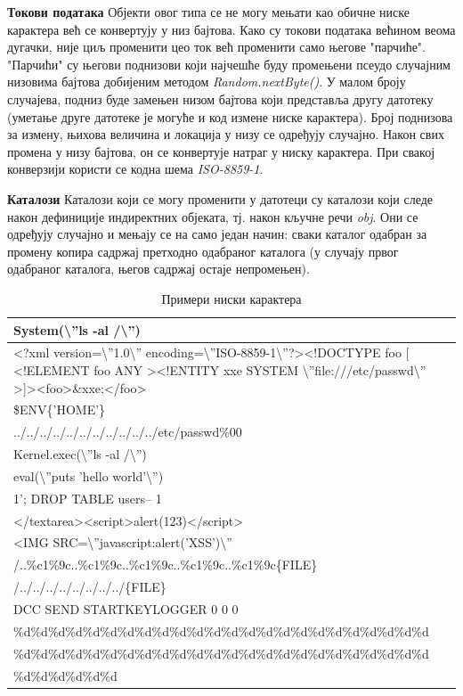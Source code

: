 \documentclass[12pt,oneside]{memoir}
\begin{document}
\begin{description}
\item{\textbf{Токови података}} Објекти овог типа се не могу мењати као обичне ниске карактера већ се конвертују у низ бајтова. Како су токови података већином веома дугачки, није циљ променити цео ток већ променити само његове "парчиће". "Парчићи" су његови поднизови који најчешће буду промењени псеудо случајним низовима бајтова добијеним методом \textit{Random.nextByte()}. У малом броју случајева, подниз буде замењен низом бајтова који представља другу датотеку (уметање друге датотеке је могуће и код измене ниске карактера). Број поднизова за измену, њихова величина и локација у низу се одређују случајно. Након свих промена у низу бајтова, он се конвертује натраг у ниску карактера. При свакој конверзији користи се кодна шема \textit{ISO-8859-1}. 
\item{\textbf{Каталози}} Каталози који се могу променити у датотеци су каталози који следе након дефиниције индиректних објеката, тј. након кључне речи \textit{obj}. Они се одређују случајно и мењају се на само један начин: сваки каталог одабран за промену копира садржај претходно одабраног каталога (у случају првог одабраног каталога, његов садржај остаје непромењен). 
\end{description}

\begin{table}
    \begin{tabular}{| p{14cm} |}
    \hline
    System(\textbackslash''ls -al /\textbackslash'') \\ \hline
    <?xml version=\textbackslash''1.0\textbackslash'' encoding=\textbackslash''ISO-8859-1\textbackslash''?><!DOCTYPE foo [ <!ELEMENT foo ANY ><!ENTITY xxe SYSTEM \textbackslash''file:///etc/passwd\textbackslash'' >]><foo>\&xxe;</foo> \\ \hline
	\$ENV\{'HOME'\}\\ \hline
	../../../../../../../../../../../etc/passwd\%00\\ \hline
	Kernel.exec(\textbackslash''ls -al /\textbackslash'')\\ \hline
	eval(\textbackslash''puts 'hello world'\textbackslash'')\\ \hline
	1'; DROP TABLE users-- 1\\ \hline
	</textarea><script>alert(123)</script>\\ \hline
	<IMG SRC=\textbackslash''javascript:alert('XSS')\textbackslash''\\ \hline
	/..\%c1\%9c..\%c1\%9c..\%c1\%9c..\%c1\%9c..\%c1\%9c\{FILE\}\\ \hline
	/../../../../../../../../\{FILE\}\\ \hline
    	DCC SEND STARTKEYLOGGER 0 0 0 \\ \hline
\%d\%d\%d\%d\%d\%d\%d\%d\%d\%d\%d\%d\%d\%d\%d\%d\%d\%d\%d\%d\%d\%d\%d\%d \\ 
\%d\%d\%d\%d\%d\%d\%d\%d\%d\%d\%d\%d\%d\%d\%d\%d\%d\%d\%d\%d\%d\%d\%d\%d \\
\%d\%d\%d\%d\%d\%d  \\
    	\hline
    \end{tabular}
\caption{Примери ниски карактера}
\label{table:niske}
\end{table}
\end{document}
